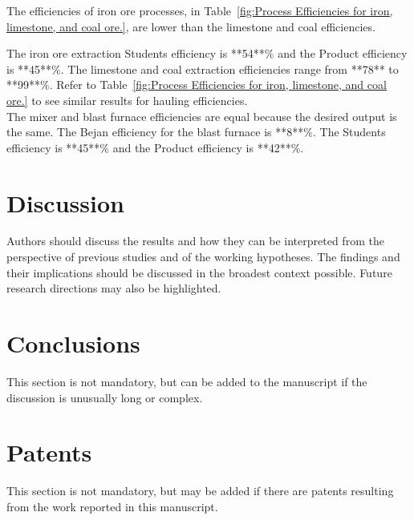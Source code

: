 \documentclass[energies,article,submit,pdftex,moreauthors]{Definitions/mdpi}
\begin{document}
The efficiencies of iron ore processes,
in Table~\ref{fig:Process Efficiencies for iron, limestone, and coal ore.},
are lower than the limestone and coal efficiencies.

The iron ore extraction Students efficiency is **54**$\%$
and the Product efficiency is **45**$\%$.
The limestone and coal extraction efficiencies range
from **78** to **99**$\%$.
Refer to Table~\ref{fig:Process Efficiencies for iron, limestone, and coal ore.}
to see similar results
for hauling efficiencies.\\
The mixer and blast furnace efficiencies
are equal because the desired output is the same.
The Bejan efficiency
for the blast furnace
is **8**$\%$.
The Students efficiency is **45**$\%$
and the Product efficiency is **42**$\%$.






\section{Discussion}
\label{discussion}

Authors should discuss the results and how they can be interpreted from the perspective of previous studies and of the working hypotheses. The findings and their implications should be discussed in the broadest context possible. Future research directions may also be highlighted.

\section{Conclusions}

This section is not mandatory, but can be added to the manuscript if the discussion is unusually long or complex.

\section{Patents}

This section is not mandatory, but may be added if there are patents resulting from the work reported in this manuscript.

\vspace{6pt}
\end{document}
